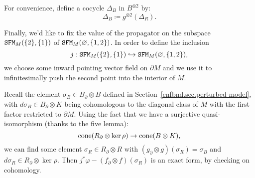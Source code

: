 \begin{definition}
  \label{cnfbnd.def.delta-b}
  For convenience, define a cocycle $\Delta_{B}$ in $B^{\otimes 2}$ by:
  \begin{equation*}
    \Delta_{B} \coloneqq g^{\otimes2}(\Delta_{R}).
  \end{equation*}
\end{definition}

Finally, we'd like to fix the value of the propagator on the subspace $\mathtt{SFM}_{M}(\{2\}, \{1\})$ of $\mathtt{SFM}_{M}(\varnothing, \{1,2\})$.
In order to define the inclusion
\begin{equation}
  \label{cnfbnd.eq.def-j-incl}
  j : \mathtt{SFM}_{M}(\{2\}, \{1\}) \hookrightarrow \mathtt{SFM}_{M}(\varnothing, \{1,2\}),
\end{equation}
we choose some inward pointing vector field on $\partial M$ and we use it to infinitesimally push the second point into the interior of $M$.

Recall the element $\sigma_{B} \in B_{\partial} \otimes B$ defined in Section~\ref{cnfbnd.sec.perturbed-model}, with $d \sigma_{B} \in B_{\partial} \otimes K$ being cohomologous to the diagonal class of $M$ with the first factor restricted to $\partial M$.
Using the fact that we have a surjective quasi-isomorphism (thanks to the five lemma):
\begin{equation}
  \operatorname{cone}(R_{\partial} \otimes \ker \rho) \to \operatorname{cone}(B \otimes K),
\end{equation}
we can find some element $\sigma_{R} \in R_{\partial} \otimes R$ with $(g_{\partial} \otimes g)(\sigma_{R}) = \sigma_{B}$ and $d \sigma_{R} \in R_{\partial} \otimes \ker \rho$.
Then $j^{*} \varphi - (f_{\partial} \otimes f)(\sigma_{R})$ is an exact form, by checking on cohomology.


